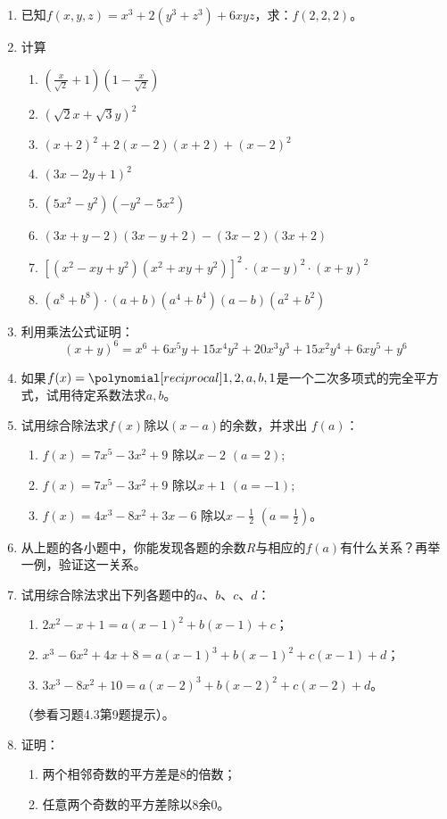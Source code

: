 \begin{enumerate}
\item 已知$f(x,y,z)=x^3+2(y^3+z^3)+6xyz$，求：$f(2,2,2)$。

\item 计算
\begin{enumerate}
    \item $\left(\frac{x}{\sqrt{2}}+1\right)\left(1-\frac{x}{\sqrt{2}}\right)$
    \item $\left(\sqrt{2}x+\sqrt{3}y\right)^2$
    \item $(x+2)^2+2(x-2)(x+2)+(x-2)^2$
    \item $(3x-2y+1)^2$
    \item $(5x^2-y^2)(-y^2-5x^2)$
    \item $(3x+y-2)(3x-y+2)-(3x-2)(3x+2)$
    \item $\left[(x^2-xy+y^2)(x^2+xy+y^2)\right]^2\cdot (x-y)^2\cdot (x+y)^2$
    \item $(a^8+b^8)\cdot (a+b)(a^4+b^4)(a-b)(a^2+b^2)$
\end{enumerate}

\item 利用乘法公式证明：
\[(x+y)^6=x^6+6x^5y+15x^4y^2+20x^3y^3+15x^2y^4+6xy^5+y^6\]
\item 如果$f(x)=\poly{1,2,a,b,1}$是一个二次多项式的完全平方式，试用待定系数法求$a,b$。
\item  试用综合除法求$f(x)$除以$(x-a)$的余数，并求出
$f (a)$：
\begin{enumerate}
    \item $f(x)=7x^5-3x^2+9$ 除以$x-2$ $(a=2)$;
    \item $f(x)=7x^5-3x^2+9$ 除以$x+1$ $(a=-1)$;
    \item $f(x)=4x^3-8x^2+3x-6$ 除以$x-\frac{1}{2}$ $(a=\frac{1}{2})$。
\end{enumerate}

\item 从上题的各小题中，你能发现各题的余数$R$与相应的$f(a)$有什么关系？再举一例，验证这一关系。
\item 试用综合除法求出下列各题中的$a$、$b$、$c$、$d$：
\begin{enumerate}
    \item $2x^2-x+1=a(x-1)^2+b(x-1)+c$；
    \item $x^3-6x^2+4x+8=a(x-1)^3+b(x-1)^2+c(x-1)+d$；
    \item $3x^3-8x^2+10=a(x-2)^3+b(x-2)^2+c(x-2)+d$。
\end{enumerate}
（参看习题4.3第9题提示）。

\item 证明：
\begin{enumerate}
    \item 两个相邻奇数的平方差是8的倍数；
    \item 任意两个奇数的平方差除以8余0。
\end{enumerate}


\end{enumerate}
